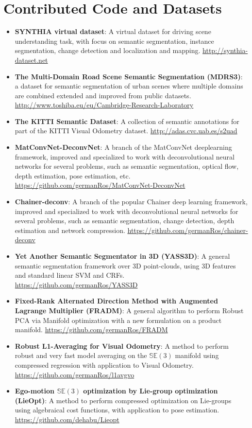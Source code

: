 \section{Contributed Code and Datasets}

\begin{itemize}
\item \textbf{SYNTHIA virtual dataset}: A virtual dataset for driving scene understanding task, with focus on semantic segmentation, instance segmentation, change detection and localization and mapping. \url{http://synthia-dataset.net}

\item \textbf{The Multi-Domain Road Scene Semantic Segmentation (MDRS3)}: a dataset for semantic segmentation of urban scenes where multiple domains are combined extended and improved from public datasets. \url{http://www.toshiba.eu/eu/Cambridge-Research-Laboratory}

\item \textbf{The KITTI Semantic Dataset}: A collection of semantic annotations for part of the KITTI Visual Odometry dataset. \url{http://adas.cvc.uab.es/s2uad}

\item \textbf{MatConvNet-DeconvNet}: A branch of the MatConvNet deeplearning framework, improved and specialized to work with deconvolutional neural networks for several problems, such as semantic segmentation, optical flow, depth estimation, pose estimation, etc. \url{https://github.com/germanRos/MatConvNet-DeconvNet}

\item \textbf{Chainer-deconv}: A branch of the popular Chainer deep learning framework, improved and specialized to work with deconvolutional neural networks for several problems, such as semantic segmentation, change detection, depth estimation and network compression. \url{https://github.com/germanRos/chainer-deconv}

\item \textbf{Yet Another Semantic Segmentator in 3D (YASS3D)}: A general semantic segmentation framework over 3D point-clouds, using 3D features and standard linear SVM and CRFs. \url{https://github.com/germanRos/YASS3D}

\item \textbf{Fixed-Rank Alternated Direction Method with Augmented Lagrange Multiplier (FRADM)}: A general algorithm to perform Robust PCA via Manifold optimization with a new formulation on a product manifold. \url{https://github.com/germanRos/FRADM}

\item\textbf{ Robust L1-Averaging for Visual Odometry}: A method to perform robust and very fast model averaging on the $\mathbb{SE}(3)$ manifold using compressed regression with application to Visual Odometry. \url{https://github.com/germanRos/l1avgvo}

\item \textbf{Ego-motion $\mathbb{SE}(3)$ optimization by Lie-group optimization (LieOpt)}: A method to perform compressed optimization on Lie-groups using algebraical cost functions, with application to pose estimation. \url{https://github.com/dehabu/Lieopt}
\end{itemize}

